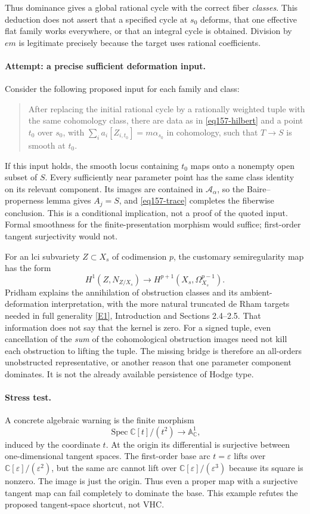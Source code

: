 \documentclass[11pt,a4paper]{article}
\newcommand{\C}{\mathbb{C}}
\newcommand{\A}{\mathbb{A}}
\newcommand{\eref}[2]{\hyperlink{extra:#1:#2}{[E#2]}}
\numberwithin{equation}{section}
\begin{document}
Thus dominance gives a global rational cycle with the correct fiber
\emph{classes}. This deduction does not assert that a specified cycle at
$s_0$ deforms, that one effective flat family works everywhere, or that an
integral cycle is obtained. Division by $em$ is legitimate precisely
because the target uses rational coefficients.

\paragraph{Attempt: a precise sufficient deformation input.}
Consider the following proposed input for each family and class:
\begin{quote}
After replacing the initial rational cycle by a rationally weighted tuple
with the same cohomology class, there are data as in
\eqref{eq157-hilbert} and a point $t_0$ over $s_0$, with
$\sum_i a_i[Z_{i,t_0}]=m\alpha_{s_0}$ in cohomology, such that
$T\to S$ is smooth at $t_0$.
\end{quote}
If this input holds, the smooth locus containing $t_0$ maps onto a
nonempty open subset of $S$. Every sufficiently near parameter point has
the same class identity on its relevant component. Its images are
contained in $\mathcal A_\alpha$, so the Baire--properness lemma gives
$A_j=S$, and \eqref{eq157-trace} completes the fiberwise conclusion. This
is a conditional implication, not a proof of the quoted input.
Formal smoothness for the finite-presentation morphism would suffice;
first-order tangent surjectivity would not.

For an lci subvariety $Z\subset X_s$ of codimension $p$, the customary
semiregularity map has the form
\[
 H^1(Z,N_{Z/X_s})\longrightarrow
 H^{p+1}(X_s,\Omega_{X_s}^{p-1}).
\]
Pridham explains the annihilation of obstruction classes and its
ambient-deformation interpretation, with the more natural truncated
de Rham targets needed in full generality \eref{157}{1}, Introduction
and Sections 2.4--2.5. That information does not say that the kernel is
zero. For a signed tuple, even cancellation of the \emph{sum} of the
cohomological obstruction images need not kill each obstruction to
lifting the tuple. The missing bridge is therefore an all-orders
unobstructed representative, or another reason that one parameter
component dominates. It is not the already available persistence of
Hodge type.

\paragraph{Stress test.}
A concrete algebraic warning is the finite morphism
\[
 \operatorname{Spec}\C[t]/(t^2)\longrightarrow\A^1_{\C},
\]
induced by the coordinate $t$. At the origin its differential is
surjective between one-dimensional tangent spaces. The first-order base
arc $t=\varepsilon$ lifts over $\C[\varepsilon]/(\varepsilon^2)$, but the
same arc cannot lift over $\C[\varepsilon]/(\varepsilon^3)$ because its
square is nonzero. The image is just the origin. Thus even a proper map
with a surjective tangent map can fail completely to dominate the base.
This example refutes the proposed tangent-space shortcut, not VHC.
\end{document}
